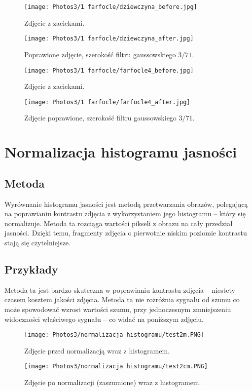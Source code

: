 \documentclass[]{mwart}
\begin{document}
\begin{figure}[H]
    \centering
    \texttt{[image: Photos3/1 farfocle/dziewczyna\_before.jpg]}
    \caption{Zdjęcie z zaciekami.}
\end{figure}
\begin{figure}[H]
    \centering
    \texttt{[image: Photos3/1 farfocle/dziewczyna\_after.jpg]}
    \caption{Poprawione zdjęcie, szerokość filtru gaussowskiego $3/71$.}
\end{figure}

\begin{figure}[H]
    \centering
    \texttt{[image: Photos3/1 farfocle/farfocle4\_before.jpg]}
    \caption{Zdjęcie z zaciekami.}
\end{figure}
\begin{figure}[H]
    \centering
    \texttt{[image: Photos3/1 farfocle/farfocle4\_after.jpg]}
    \caption{Zdjęcie poprawione, szerokość filtru gaussowskiego $3/71$.}
\end{figure}




\newpage

\section{Normalizacja histogramu jasności       }
\subsection{Metoda}
Wyrównanie histogramu jasności jest metodą przetwarzania obrazów, polegającą na
poprawianiu kontrastu zdjęcia z wykorzystaniem jego histogramu -- który się normalizuje.
Metoda ta rozciąga wartości pikseli z obrazu na cały przedział jasności.
Dzięki temu, fragmenty zdjęcia o pierwotnie niskim poziomie kontrastu stają się czytelniejsze.


\subsection{Przykłady}
Metoda ta jest bardzo skuteczna w poprawianiu kontrastu zdjęcia -- niestety czasem
kosztem jakości zdjęcia. Metoda ta nie rozróżnia sygnału od szumu co może spowodować wzrost wartości szumu,
przy jednoczesnym zmniejszeniu widoczności właściwego sygnału -- co widać na poniższym zdjęciu.


\begin{figure}[H]
    \centering
    \texttt{[image: Photos3/normalizacja histogramu/test2m.PNG]}
    \caption{Zdjęcie przed normalizacją wraz z histogramem.}
\end{figure}
\begin{figure}[H]
    \centering
    \texttt{[image: Photos3/normalizacja histogramu/test2cm.PNG]}
    \caption{Zdjęcie po normalizacji (zaszumione) wraz z histogramem.}
\end{figure}
\end{document}
